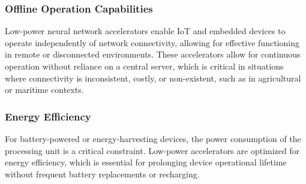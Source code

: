 \subsubsection{Offline Operation Capabilities}
Low-power neural network accelerators enable IoT and embedded devices to operate independently of network connectivity, allowing for effective functioning in remote or disconnected environments. These accelerators allow for continuous operation without reliance on a central server, which is critical in situations where connectivity is inconsistent, costly, or non-existent, such as in agricultural or maritime contexts.

\subsubsection{Energy Efficiency}
For battery-powered or energy-harvesting devices, the power consumption of the processing unit is a critical constraint. Low-power accelerators are optimized for energy efficiency, which is essential for prolonging device operational lifetime without frequent battery replacements or recharging.

